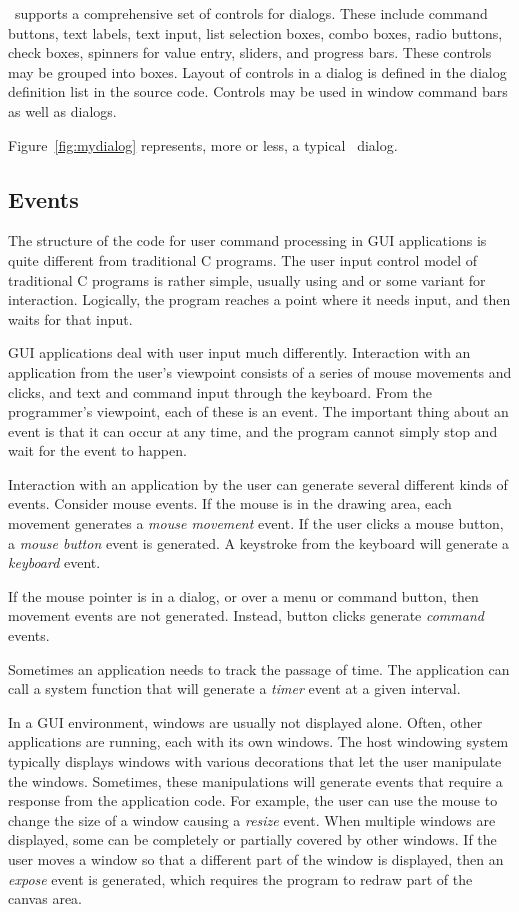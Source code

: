 \V\ supports a comprehensive set of controls for dialogs. These
include command buttons, text labels, text input, list selection
boxes, combo boxes, radio buttons, check boxes, spinners for
value entry, sliders, and progress bars. These controls may be
grouped into boxes. Layout of controls in a dialog is defined in
the dialog definition list in the source code. Controls may be
used in window command bars as well as dialogs.

Figure~\ref{fig:mydialog} represents, more or less, a typical
\V\ dialog.

\subsection*{Events}

The structure of the code for user command processing in GUI
applications is quite different from traditional C programs. The
user input control model of traditional C programs is rather
simple, usually using  and  or some
variant for interaction. Logically, the program reaches a point
where it needs input, and then waits for that input.

GUI applications deal with user input much differently.
Interaction with an application from the user's viewpoint
consists of a series of mouse movements and clicks, and text and
command input through the keyboard. From the programmer's
viewpoint, each of these is an event. The important thing about
an event is that it can occur at any time, and the program cannot
simply stop and wait for the event to happen.

Interaction with an application by the user can generate several
different kinds of events. Consider mouse events.
If the mouse is in the drawing area, each movement generates a
\emph{mouse movement} event. If the user clicks a mouse button, a
\emph{mouse button} event is generated. A keystroke from the
keyboard will generate a \emph{keyboard} event.

If the mouse pointer is in a dialog, or over a menu or command
button, then movement events are not generated. Instead, button
clicks generate \emph{command} events. 

Sometimes an application needs to track the passage of time. The
application can call a system function that will generate a
\emph{timer} event at a given interval.

In a GUI environment, windows are usually not displayed alone. Often,
other applications are running, each with its own windows. The
host windowing system typically displays windows with various decorations
that let the user manipulate the windows. Sometimes, these
manipulations will generate events that require a response
from the application code. For example, the user can use the
mouse to change the size of a window causing a \emph{resize}
event. When multiple windows are displayed, some can be
completely or partially covered by other windows. If the user
moves a window so that a different part of the window is
displayed, then an \emph{expose} event is generated, which
requires the program to redraw part of the canvas area.

